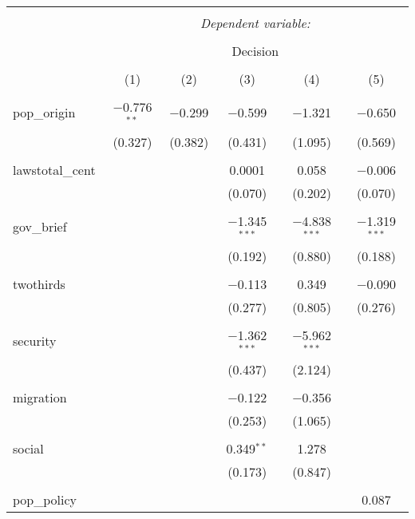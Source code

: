 
\begin{table}[!htbp] \centering 
  \caption{} 
  \label{} 
\begin{tabular}{@{\extracolsep{5pt}}lccccc} 
\\[-1.8ex]\hline 
\hline \\[-1.8ex] 
 & \multicolumn{5}{c}{\textit{Dependent variable:}} \\ 
\cline{2-6} 
\\[-1.8ex] & \multicolumn{5}{c}{Decision} \\ 
\\[-1.8ex] & (1) & (2) & (3) & (4) & (5)\\ 
\hline \\[-1.8ex] 
 pop\_origin & $-$0.776$^{**}$ & $-$0.299 & $-$0.599 & $-$1.321 & $-$0.650 \\ 
  & (0.327) & (0.382) & (0.431) & (1.095) & (0.569) \\ 
  & & & & & \\ 
 lawstotal\_cent &  &  & 0.0001 & 0.058 & $-$0.006 \\ 
  &  &  & (0.070) & (0.202) & (0.070) \\ 
  & & & & & \\ 
 gov\_brief &  &  & $-$1.345$^{***}$ & $-$4.838$^{***}$ & $-$1.319$^{***}$ \\ 
  &  &  & (0.192) & (0.880) & (0.188) \\ 
  & & & & & \\ 
 twothirds &  &  & $-$0.113 & 0.349 & $-$0.090 \\ 
  &  &  & (0.277) & (0.805) & (0.276) \\ 
  & & & & & \\ 
 security &  &  & $-$1.362$^{***}$ & $-$5.962$^{***}$ &  \\ 
  &  &  & (0.437) & (2.124) &  \\ 
  & & & & & \\ 
 migration &  &  & $-$0.122 & $-$0.356 &  \\ 
  &  &  & (0.253) & (1.065) &  \\ 
  & & & & & \\ 
 social &  &  & 0.349$^{**}$ & 1.278 &  \\ 
  &  &  & (0.173) & (0.847) &  \\ 
  & & & & & \\ 
 pop\_policy &  &  &  &  & 0.087 \\ 

\end{tabular}
\end{table}
